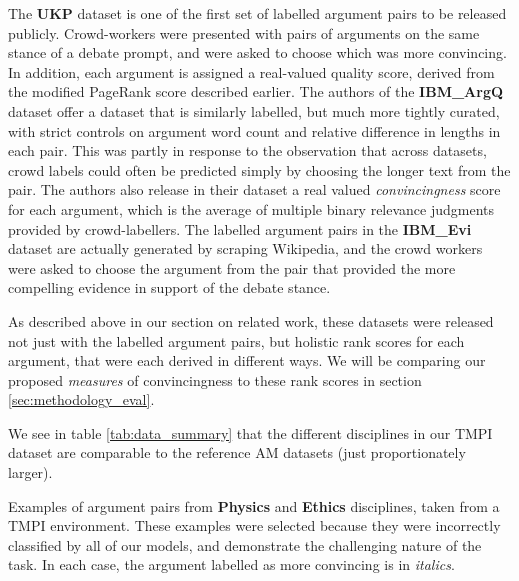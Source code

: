 \documentclass[notitlepage,12pt]{jedm}
\begin{document}
The \textbf{UKP} dataset \cite{habernal_which_2016} is one of the first set of 
labelled argument pairs to be released publicly.
Crowd-workers were presented with pairs of arguments on the same stance of a 
debate prompt, and were asked to choose which was more convincing.
In addition, each argument is assigned a real-valued quality score, derived 
from the modified PageRank score described earlier.
The authors of the \textbf{IBM\_ArgQ} dataset \cite{toledo_automatic_2019} 
offer a dataset that is similarly labelled, but much more tightly curated, with 
strict controls on argument word count and relative difference in lengths in 
each pair.
This was partly in response to the observation that across datasets, crowd 
labels could often be predicted simply by choosing the longer text from the 
pair.
The authors also release in their dataset a real valued \textit{convincingness} 
score for each argument, which is the average of multiple binary relevance 
judgments provided by crowd-labellers. 
The labelled argument pairs in the \textbf{IBM\_Evi} dataset 
\cite{gleize_are_2019} are actually generated by scraping Wikipedia, and the 
crowd workers were asked to choose the argument from the pair that provided the 
more compelling evidence in support of the debate stance.

As described above in our section on related work, these datasets were released 
not just with the labelled argument pairs, but holistic rank scores for each 
argument, that were each derived in different ways. 
We will be comparing our proposed \textit{measures} of convincingness to these 
rank scores in section \ref{sec:methodology_eval}.


We see in table \ref{tab:data_summary} that the different disciplines in our 
TMPI dataset are comparable to the reference AM datasets (just proportionately 
larger).

\begin{table}[H]
	\caption{
		Examples of argument pairs from \textbf{Physics} and \textbf{Ethics} 
		disciplines, taken from a TMPI environment. 
		These examples were selected because they were incorrectly classified 
		by all of our models, and demonstrate the challenging nature of the 
		task. 
		In each case, the argument labelled as more convincing is in 
		\textit{italics}.}
	\label{tab:sample_obs_dalite}
	\begin{subtable}[t]{\textwidth}
		
	\end{subtable}
	\begin{subtable}[t]{\textwidth}
		
	\end{subtable}
\end{table}
\end{document}
